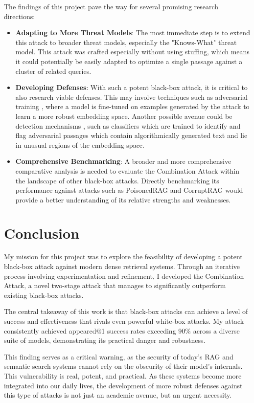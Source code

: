 \documentclass[a4paper, sigconf]{acmart}
\begin{document}
The findings of this project pave the way for several promising research directions:

\begin{itemize}
  \item \textbf{Adapting to More Threat Models}: The most immediate step is to extend this attack to broader threat models, especially the "Knows-What" threat model. This attack was crafted especially without using stuffing, which means it could potentially be easily adapted to optimize a single passage against a cluster of related queries. 
  \item \textbf{Developing Defenses}: With such a potent black-box attack, it is critical to also research viable defenses. This may involve techniques such as adversarial training \cite{???}, where a model is fine-tuned on examples generated by the attack to learn a more robust embedding space. Another possible avenue could be detection mechanisms \cite{???}, such as classifiers which are trained to identify and flag adversarial passages which contain algorithmically generated text and lie in unusual regions of the embedding space.  
  \item \textbf{Comprehensive Benchmarking}: A broader and more comprehensive comparative analysis is needed to evaluate the Combination Attack within the landscape of other black-box attacks. Directly benchmarking its performance against attacks such as PoisonedRAG \cite{???} and CorruptRAG \cite{???} would provide a better understanding of its relative strengths and weaknesses.
\end{itemize}


\section{Conclusion}

My mission for this project was to explore the feasibility of developing a potent black-box attack against modern dense retrieval systems. Through an iterative process involving experimentation and refinement, I developed the Combination Attack, a novel two-stage attack that manages to significantly outperform existing black-box attacks.

The central takeaway of this work is that black-box attacks can achieve a level of success and effectiveness that rivals even powerful white-box attacks. My attack consistently achieved appeared@1 success rates exceeding 90\% across a diverse suite of models, demonstrating its practical danger and robustness. 

This finding serves as a critical warning, as the security of today's RAG and semantic search systems cannot rely on the obscurity of their model's internals. This vulnerability is real, potent, and practical. As these systems become more integrated into our daily lives, the development of more robust defenses against this type of attacks is not just an academic avenue, but an urgent necessity. 


 

\end{document}
